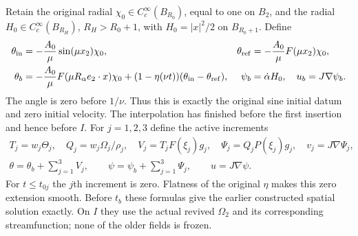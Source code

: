 Retain the original radial $\chi_0\in C_c^\infty(B_{R_0})$,
equal to one on $B_2$, and the radial
$H_0\in C_c^\infty(B_{R_H})$, $R_H>R_0+1$, with
$H_0=|x|^2/2$ on $B_{R_0+1}$. Define
\begin{align}\label{tts:base}
 \theta_{\rm in}&=-\frac{A_0}{\mu}\sin(\mu x_2)\chi_0,
 &\theta_{\rm ref}&=-\frac{A_0}{\mu}F(\mu x_2)\chi_0,
 \nonumber\\
 \theta_b&=-\frac{A_0}{\mu}F(\mu R_\alpha e_2\cdot x)\chi_0
       +(1-\eta(\nu t))(\theta_{\rm in}-\theta_{\rm ref}),
 &\psi_b&=\dot\alpha H_0,\quad u_b=J\nabla\psi_b.
\end{align}
The angle is zero before $1/\nu$. Thus this is exactly the
original sine initial datum and zero initial velocity. The
interpolation has finished before the first insertion and hence
before $I$. For $j=1,2,3$ define the active increments
\begin{equation}\label{tts:fields}
 \begin{gathered}
 T_j=w_j\Theta_j,\quad Q_j=w_j\Omega_j/\rho_j,\quad
 V_j=T_jF(\xi_j)g_j,\quad\Psi_j=Q_jP(\xi_j)g_j,\quad
 v_j=J\nabla\Psi_j,\\
 \theta=\theta_b+\sum_{j=1}^3V_j,\qquad
 \psi=\psi_b+\sum_{j=1}^3\Psi_j,\qquad u=J\nabla\psi.
 \end{gathered}
\end{equation}
For $t\leq t_{0j}$ the $j$th increment is zero. Flatness of the
original $\eta$ makes this zero extension smooth. Before $t_b$
these formulas give the earlier constructed spatial solution
exactly. On $I$ they use the actual revived $\Omega_2$ and its
corresponding streamfunction; none of the older fields is frozen.

